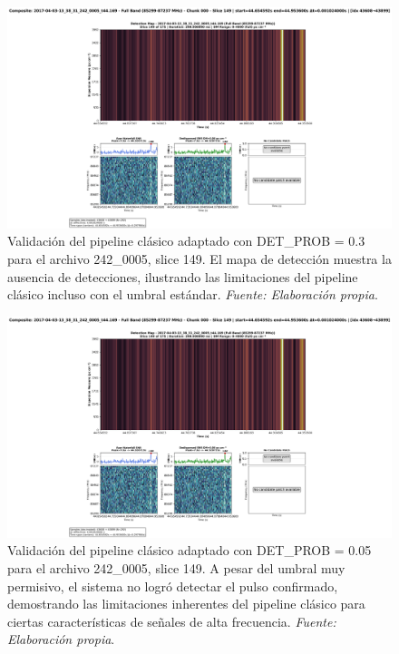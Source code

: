 \begin{figure}[H]
    \centering
    \includegraphics[width=\textwidth]{figures/2017-04-03-13_38_31_242_0005_t44.169_slice149.png}
    \caption[ALMA 242\_0005: DET\_PROB 0.3]{Validación del pipeline clásico adaptado con DET\_PROB = 0.3 para el archivo 242\_0005, slice 149. El mapa de detección muestra la ausencia de detecciones, ilustrando las limitaciones del pipeline clásico incluso con el umbral estándar. \textit{Fuente: Elaboración propia}.}
    \label{fig:242_0005_slice149_highProb}
\end{figure}

\begin{figure}[H]
    \centering
    \includegraphics[width=\textwidth]{figures/2017-04-03-13_38_31_242_0005_t44.169_slice149-lowProb.png}
    \caption[ALMA 242\_0005: DET\_PROB 0.05]{Validación del pipeline clásico adaptado con DET\_PROB = 0.05 para el archivo 242\_0005, slice 149. A pesar del umbral muy permisivo, el sistema no logró detectar el pulso confirmado, demostrando las limitaciones inherentes del pipeline clásico para ciertas características de señales de alta frecuencia. \textit{Fuente: Elaboración propia}.}
    \label{fig:242_0005_slice149_lowProb}
\end{figure}

